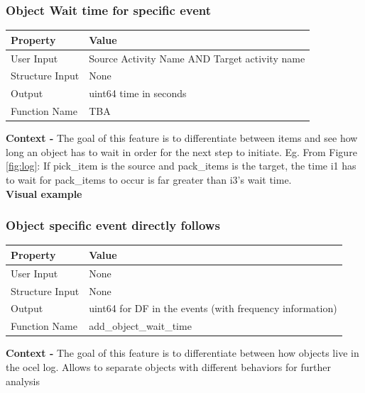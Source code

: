 \documentclass{article}
\begin{document}
\subsubsection{Object Wait time for specific event}
\begin{center}
	\begin{tabular}{| p{3cm} p{7cm} |}
		\hline
		\textbf{Property} & \textbf{Value}\\
		\hline
		User Input & Source Activity Name AND Target activity name\\
		Structure Input & None\\
		Output & uint64 time in seconds\\
		Function Name & TBA\\
		\hline
	\end{tabular}
\end{center}

\textbf{Context -} The goal of this feature is to differentiate between items and see how long an object has to wait in order for the next step to initiate. Eg. From Figure \ref{fig:log}: If pick\_item is the source and pack\_items is the target, the time i1 has to wait for pack\_items to occur is far greater than i3's wait time.
\\

\textbf{Visual example}
\subsubsection{Object specific event directly follows}
\begin{center}
	\begin{tabular}{| p{3cm} p{7cm} |}
		\hline
		\textbf{Property} & \textbf{Value}\\
		\hline
		User Input & None\\
		Structure Input & None\\
		Output & uint64 for DF in the events (with frequency information)\\
		Function Name & add\_object\_wait\_time\\
		\hline
	\end{tabular}
\end{center}

\textbf{Context -} The goal of this feature is to differentiate between how objects live in the ocel log. Allows to separate objects with different behaviors for further analysis
\\
\end{document}
